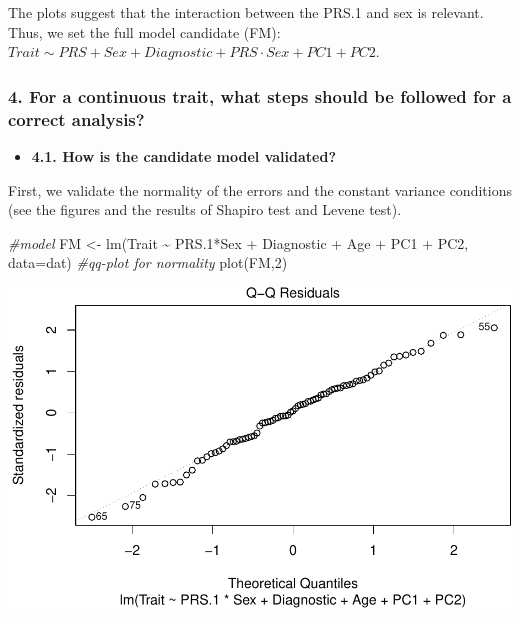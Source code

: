\documentclass[
]{article}
\newenvironment{Shaded}{\begin{snugshade}}{\end{snugshade}}
\newcommand{\AttributeTok}[1]{\textcolor[rgb]{0.77,0.63,0.00}{#1}}
\newcommand{\CommentTok}[1]{\textcolor[rgb]{0.56,0.35,0.01}{\textit{#1}}}
\newcommand{\DecValTok}[1]{\textcolor[rgb]{0.00,0.00,0.81}{#1}}
\newcommand{\FloatTok}[1]{\textcolor[rgb]{0.00,0.00,0.81}{#1}}
\newcommand{\FunctionTok}[1]{\textcolor[rgb]{0.00,0.00,0.00}{#1}}
\newcommand{\NormalTok}[1]{#1}
\newcommand{\OtherTok}[1]{\textcolor[rgb]{0.56,0.35,0.01}{#1}}
\newcommand{\SpecialCharTok}[1]{\textcolor[rgb]{0.00,0.00,0.00}{#1}}
\providecommand{\tightlist}{%
  \setlength{\itemsep}{0pt}\setlength{\parskip}{0pt}}
\begin{document}
The plots suggest that the interaction between the PRS.1 and sex is
relevant. Thus, we set the full model candidate (FM):
\(Trait \sim PRS + Sex + Diagnostic + PRS\cdot Sex + PC1 +PC2\).

\hypertarget{for-a-continuous-trait-what-steps-should-be-followed-for-a-correct-analysis}{%
\subsubsection{4. For a continuous trait, what steps should be followed
for a correct
analysis?}\label{for-a-continuous-trait-what-steps-should-be-followed-for-a-correct-analysis}}

\begin{itemize}
\tightlist
\item
  \textbf{4.1. How is the candidate model validated?}
\end{itemize}

First, we validate the normality of the errors and the constant variance
conditions (see the figures and the results of Shapiro test and Levene
test).

\begin{Shaded}
\begin{Highlighting}[]
\CommentTok{\#model}
\NormalTok{FM }\OtherTok{\textless{}{-}} \FunctionTok{lm}\NormalTok{(Trait }\SpecialCharTok{\textasciitilde{}}\NormalTok{ PRS}\FloatTok{.1}\SpecialCharTok{*}\NormalTok{Sex }\SpecialCharTok{+}\NormalTok{ Diagnostic }\SpecialCharTok{+}\NormalTok{ Age }\SpecialCharTok{+}\NormalTok{ PC1 }\SpecialCharTok{+}\NormalTok{ PC2, }\AttributeTok{data=}\NormalTok{dat)}
\CommentTok{\#qq{-}plot for normality }
\FunctionTok{plot}\NormalTok{(FM,}\DecValTok{2}\NormalTok{)   }
\end{Highlighting}
\end{Shaded}

\includegraphics{WorkingExample3_code_files/figure-latex/unnamed-chunk-7-1.pdf}
\end{document}
